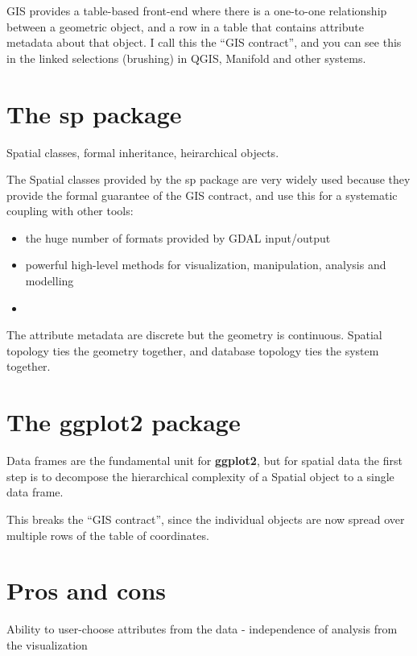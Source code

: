 \documentclass[]{book}
\begin{document}
GIS provides a table-based front-end where there is a one-to-one
relationship between a geometric object, and a row in a table that
contains attribute metadata about that object. I call this the ``GIS
contract'', and you can see this in the linked selections (brushing) in
QGIS, Manifold and other systems.

\chapter{\texorpdfstring{The \textbf{sp}
package}{The sp package}}\label{the-sp-package}

Spatial classes, formal inheritance, heirarchical objects.

The Spatial classes provided by the sp package are very widely used
because they provide the formal guarantee of the GIS contract, and use
this for a systematic coupling with other tools:

\begin{itemize}
\item
  the huge number of formats provided by GDAL input/output
\item
  powerful high-level methods for visualization, manipulation, analysis
  and modelling
\item
\end{itemize}

The attribute metadata are discrete but the geometry is continuous.
Spatial topology ties the geometry together, and database topology ties
the system together.

\chapter{\texorpdfstring{The \textbf{ggplot2}
package}{The ggplot2 package}}\label{the-ggplot2-package}

Data frames are the fundamental unit for \textbf{ggplot2}, but for
spatial data the first step is to decompose the hierarchical complexity
of a Spatial object to a single data frame.

This breaks the ``GIS contract'', since the individual objects are now
spread over multiple rows of the table of coordinates.

\chapter{Pros and cons}\label{pros-and-cons}

Ability to user-choose attributes from the data - independence of
analysis from the visualization
\end{document}
